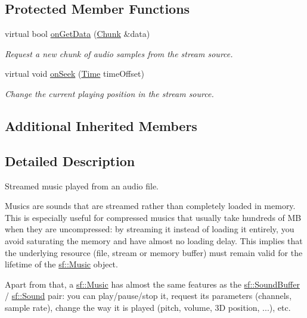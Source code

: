 \subsection*{Protected Member Functions}
\begin{DoxyCompactItemize}
\item 
virtual bool \hyperlink{classsf_1_1_music_aca1bcb4e5d56a854133e74bd86374463}{on\+Get\+Data} (\hyperlink{structsf_1_1_sound_stream_1_1_chunk}{Chunk} \&data)
\begin{DoxyCompactList}\small\item\em Request a new chunk of audio samples from the stream source. \end{DoxyCompactList}\item 
virtual void \hyperlink{classsf_1_1_music_a15119cc0419c16bb334fa0698699c02e}{on\+Seek} (\hyperlink{classsf_1_1_time}{Time} time\+Offset)
\begin{DoxyCompactList}\small\item\em Change the current playing position in the stream source. \end{DoxyCompactList}\end{DoxyCompactItemize}
\subsection*{Additional Inherited Members}


\subsection{Detailed Description}
Streamed music played from an audio file. 

Musics are sounds that are streamed rather than completely loaded in memory. This is especially useful for compressed musics that usually take hundreds of MB when they are uncompressed\+: by streaming it instead of loading it entirely, you avoid saturating the memory and have almost no loading delay. This implies that the underlying resource (file, stream or memory buffer) must remain valid for the lifetime of the \hyperlink{classsf_1_1_music}{sf\+::\+Music} object.

Apart from that, a \hyperlink{classsf_1_1_music}{sf\+::\+Music} has almost the same features as the \hyperlink{classsf_1_1_sound_buffer}{sf\+::\+Sound\+Buffer} / \hyperlink{classsf_1_1_sound}{sf\+::\+Sound} pair\+: you can play/pause/stop it, request its parameters (channels, sample rate), change the way it is played (pitch, volume, 3D position, ...), etc.

